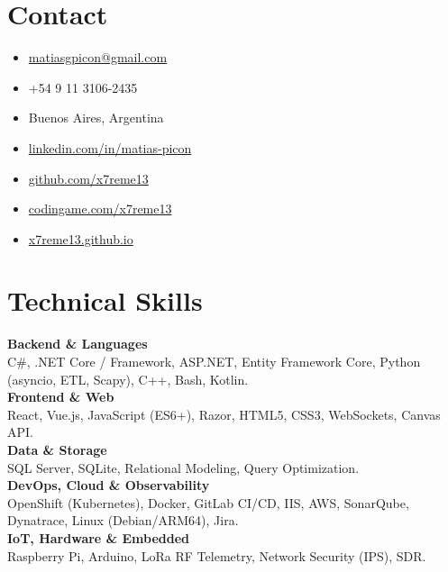 \documentclass[10pt,a4paper]{article}
\begin{document}
\hspace*{1.2cm}%
\begin{minipage}[t]{6.3cm}
\raggedright

\section{Contact}
{\footnotesize\color{darktext}
\begin{itemize}[leftmargin=1.5em, itemsep=3.5pt, topsep=2pt]
  \item[\faEnvelope] \href{mailto:matiasgpicon@gmail.com}{matiasgpicon@gmail.com}
  \item[\faPhone] +54 9 11 3106-2435
  \item[\faMapMarker*] Buenos Aires, Argentina
  \item[\faLinkedin] \href{https://www.linkedin.com/in/matias-picon}{linkedin.com/in/matias-picon}
  \item[\faGithub] \href{https://github.com/x7reme13}{github.com/x7reme13}
  \item[\faCode] \href{https://www.codingame.com/profile/x7reme13}{codingame.com/x7reme13}
  \item[\faGlobe] \href{https://x7reme13.github.io}{x7reme13.github.io}
\end{itemize}
}

\section{Technical Skills}
{\footnotesize\color{darktext}
\textbf{\color{primary}Backend \& Languages}\\
C\#, .NET Core / Framework, ASP.NET, Entity Framework Core, Python (asyncio, ETL, Scapy), C++, Bash, Kotlin.\\[4pt]
\textbf{\color{primary}Frontend \& Web}\\
React, Vue.js, JavaScript (ES6+), Razor, HTML5, CSS3, WebSockets, Canvas API.\\[4pt]
\textbf{\color{primary}Data \& Storage}\\
SQL Server, SQLite, Relational Modeling, Query Optimization.\\[4pt]
\textbf{\color{primary}DevOps, Cloud \& Observability}\\
OpenShift (Kubernetes), Docker, GitLab CI/CD, IIS, AWS, SonarQube, Dynatrace, Linux (Debian/ARM64), Jira.\\[4pt]
\textbf{\color{primary}IoT, Hardware \& Embedded}\\
Raspberry Pi, Arduino, LoRa RF Telemetry, Network Security (IPS), SDR.
}


\end{minipage}
\end{document}
